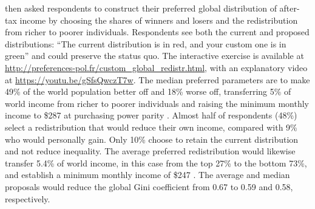 
\citet{fabre_public_2026} then asked respondents to construct their preferred global distribution of after-tax income by choosing the shares of winners and losers and the redistribution from richer to poorer individuals. Respondents see both the current and proposed distributions: ``The current distribution is in red, and your custom one is in green'' and could preserve the status quo. The interactive exercise is available at \url{http://preferences-pol.fr/custom_global_redistr.html}, with an explanatory video at \url{https://youtu.be/gSfsQwczT7w}. The median preferred parameters are to make 49\% of the world population better off and 18\% worse off, transferring 5\% of world income from richer to poorer individuals and raising the minimum monthly income to \$287 at purchasing power parity \citep[Figure S49]{fabre_public_2026}. Almost half of respondents (48\%) select a redistribution that would reduce their own income, compared with 9\% who would personally gain. Only 10\% choose to retain the current distribution and not reduce inequality. The average preferred redistribution would likewise transfer 5.4\% of world income, in this case from the top 27\% to the bottom 73\%, and establish a minimum monthly income of \$247 \citep[Figure S50]{fabre_public_2026}. The average and median proposals would reduce the global Gini coefficient from 0.67 to 0.59 and 0.58, respectively. 







